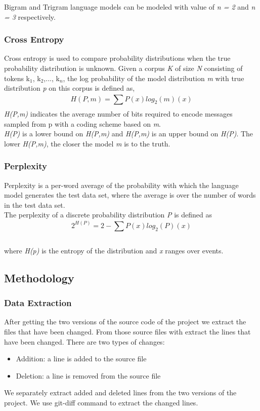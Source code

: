 \documentclass[conference]{IEEEtran}
\begin{document}
Bigram and Trigram language models can be modeled with value of \textit{n = 2} and \textit{n = 3} respectively. 
\\
\subsubsection{Cross Entropy}

Cross entropy is used to compare probability distributions when the true probability distribution is unknown. Given a corpus \textit{K} of size \textit{N} consisting of tokens k$_1$, k$_2$,..., k$_n$, the log probability of the model distribution \textit{m} with true distribution \textit{p} on this corpus is defined as, 
\\
\begin{equation}
H(P,m) = \sum_{}^{} P(x)log_2(m)(x)
\end{equation}
\textit{H(P,m)} indicates the average number of bits required to encode messages sampled from p with a coding scheme based on \textit{m}.
\\
\textit{H(P)} is a lower bound on \textit{H(P,m)} and \textit{H(P,m)} is an upper bound on \textit{H(P)}. The lower \textit{H(P,m)}, the closer the model \textit{m} is to the truth.\cite {peter} \cite {julia}
\\
\subsubsection{Perplexity}
Perplexity is a per-word average of the probability with which the language model generates the test data set, where the average is over the number of words in the test data set. 
\\
The perplexity of a discrete probability distribution \textit{P} is defined as 
\\
\begin{equation}
2^{H(P)} = 2 - \sum_{}^{} P(x)log _2(P)(x)
\end{equation}
\\where \emph{H(p)} is the entropy of the distribution and \textit{x} ranges over events.

\subsection{Methodology}
\subsubsection{Data Extraction}
After getting the two versions of the source code of the project we extract the files that have been changed. From those source files with extract the lines that have been changed. There are two types of changes:
 \begin{itemize}
 \item Addition: a line is added to the source file
 \item Deletion: a line is removed from the source file
 \end{itemize}
We separately extract added and deleted lines from the two versions of the project. We use {\selectfont git-diff} command to extract the changed lines.
\end{document}
